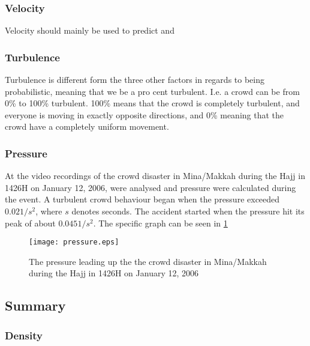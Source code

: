 \subsubsection{Velocity}
Velocity should mainly be used to predict and 

\subsubsection{Turbulence}
Turbulence is different form the three other factors in regards to being probabilistic, meaning that we be a pro cent turbulent. I.e. a crowd can be from 0\% to 100\% turbulent. 100\% means that the crowd is completely turbulent, and everyone is moving in exactly opposite directions, and 0\% meaning that the crowd have a completely uniform movement.   

\subsubsection{Pressure}
At \citet{empircalstudy} the video recordings of the crowd disaster in Mina/Makkah during the Hajj in 1426H on January 12, 2006, were analysed and pressure were calculated during the event. A turbulent crowd behaviour began when the pressure exceeded $0.02 1/s^2$, where $s$ denotes seconds. The accident started when the pressure hit its peak of about $0.045 1/s^2$. The specific graph can be seen in \cref{mekkahCrowdDistaster206}

\begin{figure}
    \centering
    \texttt{[image: pressure.eps]}
    \caption{The pressure leading up the the crowd disaster in Mina/Makkah during the Hajj in 1426H on January 12, 2006 \cite{empircalstudy}}
    \label{mekkahCrowdDistaster206}
\end{figure}


\subsection{Summary}\label{sec:crowd_conditions_summary}


\subsubsection{Density}

